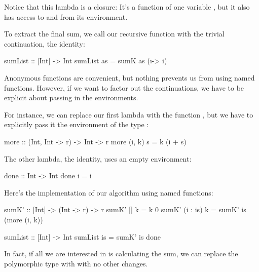 \documentclass[DaoFP]{subfiles}
\begin{document}
Notice that this lambda is a closure: It's a function of one variable , but it also has access to  and  from its environment.

To extract the final sum, we call our recursive function with the trivial continuation, the identity:
\begin{haskell}
sumList :: [Int] -> Int
sumList as = sumK as (\i -> i)
\end{haskell}

Anonymous functions are convenient, but nothing prevents us from using named functions. However, if we want to factor out the continuations, we have to be explicit about passing in the environments. 

For instance, we can replace our first lambda with the function , but we have to explicitly pass it the environment of the type :
\begin{haskell}
more :: (Int, Int -> r) -> Int -> r
more (i, k) s = k (i + s)
\end{haskell}
The other lambda, the identity, uses an empty environment:
\begin{haskell}
done :: Int -> Int
done i = i
\end{haskell}
Here's the implementation of our algorithm using named functions:
\begin{haskell}
sumK' :: [Int] -> (Int -> r) -> r
sumK' [] k = k 0
sumK' (i : is) k =
  sumK' is (more (i, k))
\end{haskell}

\begin{haskell}
sumList :: [Int] -> Int
sumList is = sumK' is done
\end{haskell}

In fact, if all we are interested in is calculating the sum, we can replace the polymorphic type  with  with no other changes.
\end{document}
